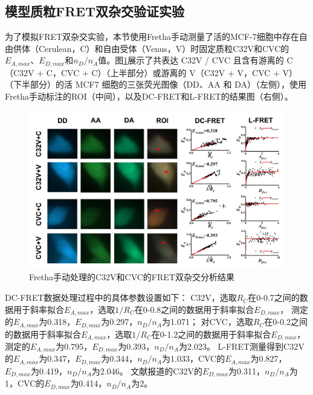 \subsection{模型质粒FRET双杂交验证实验}
\label{sec:模型质粒FRET双杂交验证实验}

为了模拟FRET双杂交实验，本节使用Fretha手动测量了活的MCF-7细胞中存在自由供体（Cerulean，C）和自由受体（Venus，V）时固定质粒C32V和CVC的$E_{A,max}$、$E_{D,max}$和$n_D/n_A$值。图\ref{fig:Fretha手动双杂交}展示了共表达 C32V / CVC 且含有游离的 C（C32V + C，CVC + C）（上半部分）或游离的 V（C32V + V，CVC + V）（下半部分）的活 MCF7 细胞的三张荧光图像（DD、AA 和 DA）（左侧），使用Fretha手动标注的ROI（中间），以及DC-FRET和L-FRET的结果图（右侧）。
\begin{figure}
  \centering
  \includegraphics[width=1\linewidth]{../figures/3/Fretha手动双杂交数据处理.png}
  \caption{Fretha手动处理的C32V和CVC的FRET双杂交分析结果}
  \label{fig:Fretha手动双杂交}
\end{figure}

DC-FRET数据处理过程中的具体参数设置如下：
C32V，选取$R_C$在0-0.7之间的数据用于斜率拟合$E_{A,max}$，选取$1/R_C$在0-0.8之间的数据用于斜率拟合$E_{D,max}$，
测定的$E_{A,max}$为0.318，$E_{D,max}$为0.297，$n_D/n_A$为1.071；
对CVC，选取$R_C$在0-0.2之间的数据用于斜率拟合$E_{A,max}$，选取$1/R_C$在0-1.2之间的数据用于斜率拟合$E_{D,max}$，
测定的$E_{A,max}$为0.795，$E_{D,max}$为0.393，$n_D/n_A$为2.023。
L-FRET测量得到C32V的$E_{A,max}$为0.347，$E_{D,max}$为0.344，$n_D/n_A$为1.033，CVC的$E_{A,max}$为0.827，$E_{D,max}$为0.419，$n_D/n_A$为2.046。
文献报道的C32V的$E_{D,max}$为0.311，$n_D/n_A$为1，CVC的$E_{D,max}$为0.414，$n_D/n_A$为2。

